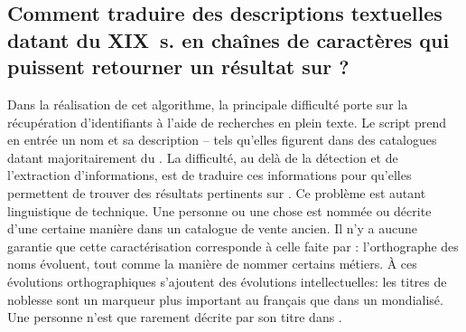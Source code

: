 \subsection{Comment traduire des descriptions textuelles datant du XIX~s. en chaînes de caractères qui puissent retourner un résultat sur \wkd{}?} 
Dans la réalisation de cet algorithme, la principale difficulté porte sur la récupération d'identifiants \wkd{} à l'aide de recherches en plein texte. Le script prend en entrée un nom et sa description -- tels qu'elles figurent dans des catalogues datant majoritairement du . La difficulté, au delà de la détection et de l'extraction d'informations, est de traduire ces informations pour qu'elles permettent de trouver des résultats pertinents sur \wkd{}. Ce problème est autant linguistique de technique. Une personne ou une chose est nommée ou décrite d'une certaine manière dans un catalogue de vente ancien. Il n'y a aucune garantie que cette caractérisation corresponde à celle faite par \wkd{}: l'orthographe des noms évoluent, tout comme la manière de nommer certains métiers. À ces évolutions orthographiques s'ajoutent des évolutions intellectuelles: les titres de noblesse sont un marqueur plus important au  français que dans un  mondialisé. Une personne n'est que rarement décrite par son titre dans \wkd{}. 

